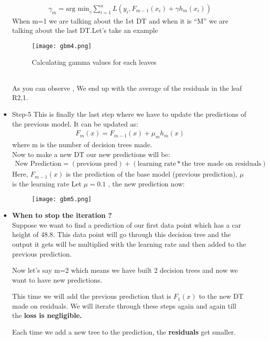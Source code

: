 \documentclass[a4paper, 11pt]{article}
\begin{document}
\begin{itemize}
        \begin{align}
            \gamma_m = \text{arg min}_\gamma \sum_{i=1}^n L(y_i,F_{m-1}(x_i) + \gamma h_m(x_i))
        \end{align}
        When m=1 we are talking about the 1st DT and when it is “M” we are talking about the last DT.Let's take an example
        \begin{figure}[h!]
            \centering
            \texttt{[image: gbm4.png]}
            \caption{Calculating gamma values for each leaves}
            \label{fig:fig4}
          \end{figure}\\ 
          As you can observe , We end up with the average of the residuals in the leaf R2,1.
          \item Step-5 This is finally the last step where we have to update the predictions of the previous model. It can be updated as:
          \begin{align}
            F_m(x) = F_{m-1}(x) + \mu_mh_m(x)
          \end{align}
          where m is the number of decision trees made. \\
          Now to make a new DT our new predictions will be:
          \begin{align}
            \text{New Prediction} = (\text{previous pred}) + (\text{learning rate} * \text{the tree made on residuals})
          \end{align}
          Here, $F_{m-1}(x)$ is the prediction of the base model (previous prediction), $\mu$ is the learning rate 
          Let $\mu = 0.1$ , the new prediction now:\\
          \begin{figure}[h!]
            \centering
            \texttt{[image: gbm5.png]}
            \label{fig:fig5}
          \end{figure}
          \item \textbf{When to stop the iteration ?} \\
           Suppose we want to find a prediction of our first data point which has a car height of 48.8. This data point will go through this decision tree and the output it gets will be multiplied with the learning rate and then added to the previous prediction.

          Now let’s say m=2 which means we have built 2 decision trees and now we want to have new predictions.
          
          This time we will add the previous prediction that is $F_1(x)$ to the new DT made on residuals. We will iterate through these steps again and again till the \textbf{loss is negligible.}

          Each time we add a new tree to the prediction, the \textbf{residuals} get smaller.
    \end{itemize} 
\end{document}
